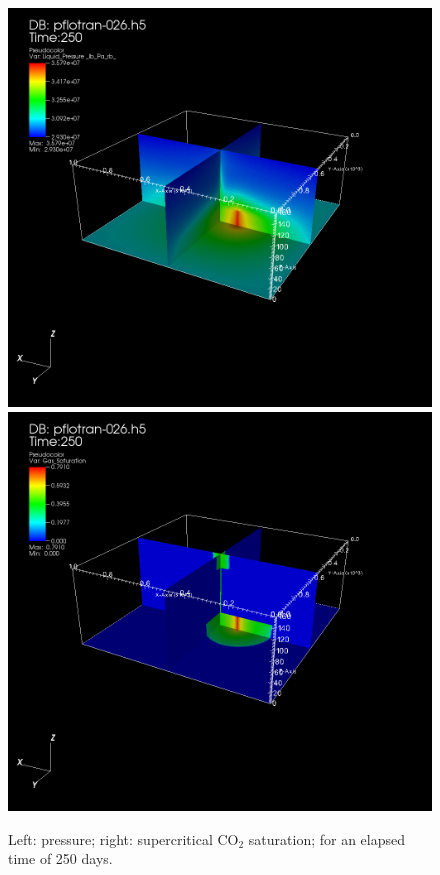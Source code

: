 \begin{figure}[h]\centering
\includegraphics[scale=0.2125]{./figs/liq_p_250d.png}
\includegraphics[scale=0.2125]{./figs/sg-250d.png}
\caption{Left: pressure; right: supercritical CO$_2$ saturation; for an elapsed time of 250 days.}\label{f250d}
\end{figure}


